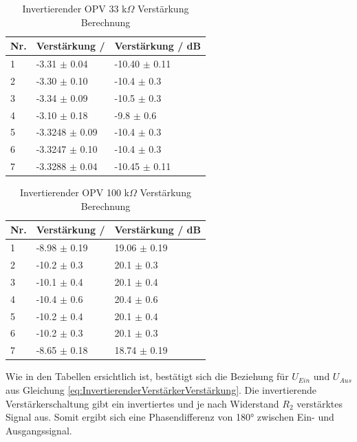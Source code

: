 \documentclass[12pt,a4paper,twoside]{article}
\begin{document}
\begin{table}[H]
    \centering
    \caption{Invertierender OPV 33 k$\Omega$ Verstärkung Berechnung}
    \label{tab:IoVerstärkungenBerechnet33}
    \begin{tabular}{| l | l | l |}
        \hline
        Nr. & Verstärkung / & Verstärkung / dB \\
        \hline
        1 & -3.31 $\pm$ 0.04 & -10.40 $\pm$ 0.11 \\
        2 & -3.30 $\pm$ 0.10 & -10.4 $\pm$ 0.3 \\
        3 & -3.34 $\pm$ 0.09 & -10.5 $\pm$ 0.3 \\
        4 & -3.10 $\pm$ 0.18 & -9.8 $\pm$ 0.6 \\
        5 & -3.3248 $\pm$ 0.09 & -10.4 $\pm$ 0.3 \\
        6 & -3.3247 $\pm$ 0.10 & -10.4 $\pm$ 0.3 \\
        7 & -3.3288 $\pm$ 0.04 & -10.45 $\pm$ 0.11 \\
        \hline
    \end{tabular}
\end{table}

\begin{table}[H]
    \centering
    \caption{Invertierender OPV 100 k$\Omega$ Verstärkung Berechnung}
    \label{tab:IoVerstärkungenBerechnet100}
    \begin{tabular}{| l | l | l |}
        \hline
        Nr. & Verstärkung / & Verstärkung / dB \\
        \hline
        1 & -8.98 $\pm$ 0.19 & 19.06 $\pm$ 0.19 \\
        2 & -10.2 $\pm$ 0.3 & 20.1 $\pm$ 0.3 \\
        3 & -10.1 $\pm$ 0.4 & 20.1 $\pm$ 0.4 \\
        4 & -10.4 $\pm$ 0.6 & 20.4 $\pm$ 0.6 \\
        5 & -10.2 $\pm$ 0.4 & 20.1 $\pm$ 0.4 \\
        6 & -10.2 $\pm$ 0.3 & 20.1 $\pm$ 0.3 \\
        7 & -8.65 $\pm$ 0.18 & 18.74 $\pm$ 0.19 \\
        \hline
    \end{tabular}
\end{table}

\noindent
Wie in den Tabellen ersichtlich ist, bestätigt sich die Beziehung für $U_{Ein}$ und $U_{Aus}$ aus Gleichung \ref{eq:InvertierenderVerstärkerVerstärkung}.
Die invertierende Verstärkerschaltung gibt ein invertiertes und je nach Widerstand $R_{2}$ verstärktes Signal aus. Somit ergibt sich eine Phasendifferenz von 180° zwischen Ein- und Ausgangssignal.
\end{document}
